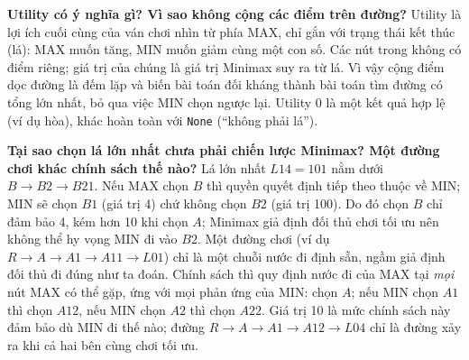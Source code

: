 \documentclass[11pt,a4paper]{article}
\begin{document}
\textbf{Utility có ý nghĩa gì? Vì sao không cộng các điểm trên đường?}
Utility là lợi ích cuối cùng của ván chơi nhìn từ phía MAX, chỉ gắn với trạng thái kết thúc (lá): MAX muốn tăng, MIN muốn giảm cùng một con số.
Các nút trong không có điểm riêng; giá trị của chúng là giá trị Minimax suy ra từ lá. Vì vậy cộng điểm dọc đường là đếm lặp và biến bài toán đối kháng thành bài toán tìm đường có tổng lớn nhất, bỏ qua việc MIN chọn ngược lại.
Utility 0 là một kết quả hợp lệ (ví dụ hòa), khác hoàn toàn với \texttt{None} (``không phải lá'').\par\medskip

\textbf{Tại sao chọn lá lớn nhất chưa phải chiến lược Minimax? Một đường chơi khác chính sách thế nào?}
Lá lớn nhất $L14 = 101$ nằm dưới $B \to B2 \to B21$. Nếu MAX chọn $B$ thì quyền quyết định tiếp theo thuộc về MIN; MIN sẽ chọn $B1$ (giá trị 4) chứ không chọn $B2$ (giá trị 100). Do đó chọn $B$ chỉ đảm bảo 4, kém hơn 10 khi chọn $A$; Minimax giả định đối thủ chơi tối ưu nên không thể hy vọng MIN đi vào $B2$.
Một đường chơi (ví dụ $R \to A \to A1 \to A11 \to L01$) chỉ là một chuỗi nước đi định sẵn, ngầm giả định đối thủ đi đúng như ta đoán.
Chính sách thì quy định nước đi của MAX tại \emph{mọi} nút MAX có thể gặp, ứng với mọi phản ứng của MIN: chọn $A$; nếu MIN chọn $A1$ thì chọn $A12$, nếu MIN chọn $A2$ thì chọn $A22$. Giá trị 10 là mức chính sách này đảm bảo dù MIN đi thế nào; đường $R \to A \to A1 \to A12 \to L04$ chỉ là đường xảy ra khi cả hai bên cùng chơi tối ưu.\par\medskip
\end{document}

